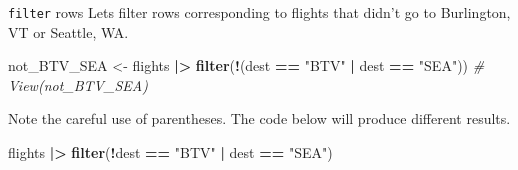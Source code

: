 \documentclass[
  ignorenonframetext,
]{beamer}
\newenvironment{Shaded}{\begin{snugshade}}{\end{snugshade}}
\newcommand{\CommentTok}[1]{\textcolor[rgb]{0.56,0.35,0.01}{\textit{#1}}}
\newcommand{\FunctionTok}[1]{\textcolor[rgb]{0.13,0.29,0.53}{\textbf{#1}}}
\newcommand{\NormalTok}[1]{#1}
\newcommand{\OtherTok}[1]{\textcolor[rgb]{0.56,0.35,0.01}{#1}}
\newcommand{\SpecialCharTok}[1]{\textcolor[rgb]{0.81,0.36,0.00}{\textbf{#1}}}
\newcommand{\StringTok}[1]{\textcolor[rgb]{0.31,0.60,0.02}{#1}}
\begin{document}
\begin{frame}[fragile]{\texttt{filter} rows}
\label{filter-rows-4}
Lets filter rows corresponding to flights that didn't go to Burlington,
VT or Seattle, WA.

\normalsize

\begin{Shaded}
\begin{Highlighting}[]
\NormalTok{not\_BTV\_SEA }\OtherTok{\textless{}{-}}\NormalTok{ flights }\SpecialCharTok{|\textgreater{}} 
  \FunctionTok{filter}\NormalTok{(}\SpecialCharTok{!}\NormalTok{(dest }\SpecialCharTok{==} \StringTok{"BTV"} \SpecialCharTok{|}\NormalTok{ dest }\SpecialCharTok{==} \StringTok{"SEA"}\NormalTok{))}
\CommentTok{\# View(not\_BTV\_SEA)}
\end{Highlighting}
\end{Shaded}

\normalsize

Note the careful use of parentheses. The code below will produce
different results. \normalsize

\begin{Shaded}
\begin{Highlighting}[]
\NormalTok{flights }\SpecialCharTok{|\textgreater{}} 
  \FunctionTok{filter}\NormalTok{(}\SpecialCharTok{!}\NormalTok{dest }\SpecialCharTok{==} \StringTok{"BTV"} \SpecialCharTok{|}\NormalTok{ dest }\SpecialCharTok{==} \StringTok{"SEA"}\NormalTok{)}
\end{Highlighting}
\end{Shaded}

\normalsize
\end{frame}
\end{document}
